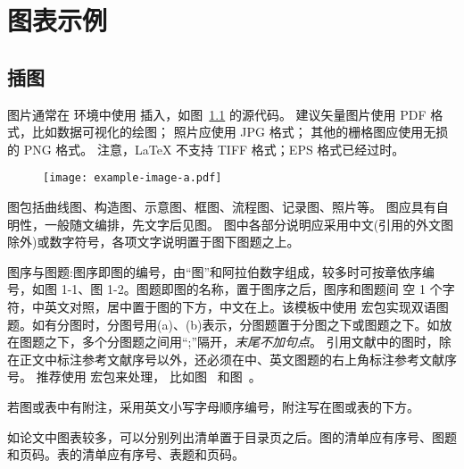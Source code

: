 
\chapter{图表示例}

\section{插图}

图片通常在  环境中使用  插入，如图~\ref{fig:example} 的源代码。
建议矢量图片使用 PDF 格式，比如数据可视化的绘图；
照片应使用 JPG 格式；
其他的栅格图应使用无损的 PNG 格式。
注意，LaTeX 不支持 TIFF 格式；EPS 格式已经过时。

\begin{figure}
  \centering
  \texttt{[image: example-image-a.pdf]}
  \label{fig:example}
\end{figure}

图包括曲线图、构造图、示意图、框图、流程图、记录图、照片等。
图应具有自明性，一般随文编排，先文字后见图。
图中各部分说明应采用中文(引用的外文图除外)或数字符号，各项文字说明置于图下图题之上。


图序与图题:图序即图的编号，由“图”和阿拉伯数字组成，较多时可按章依序编号，如图 1-1、图 1-2。图题即图的名称，置于图序之后，图序和图题间
空 1 个字符，中英文对照，居中置于图的下方，中文在上。该模板中使用  宏包实现双语图题。如有分图时，分图号用(a)、(b)表示，分图题置于分图之下或图题之下。如放在图题之下，多个分图题之间用“;”隔开，\emph{末尾不加句点}。
引用文献中的图时，除在正文中标注参考文献序号以外，还必须在中、英文图题的右上角标注参考文献序号。
推荐使用  宏包来处理， 比如图~ 和图~。

若图或表中有附注，采用英文小写字母顺序编号，附注写在图或表的下方。

如论文中图表较多，可以分别列出清单置于目录页之后。图的清单应有序号、图题和页码。表的清单应有序号、表题和页码。

\begin{figure}
  \centering
  \label{fig:multi-image}
\end{figure}



